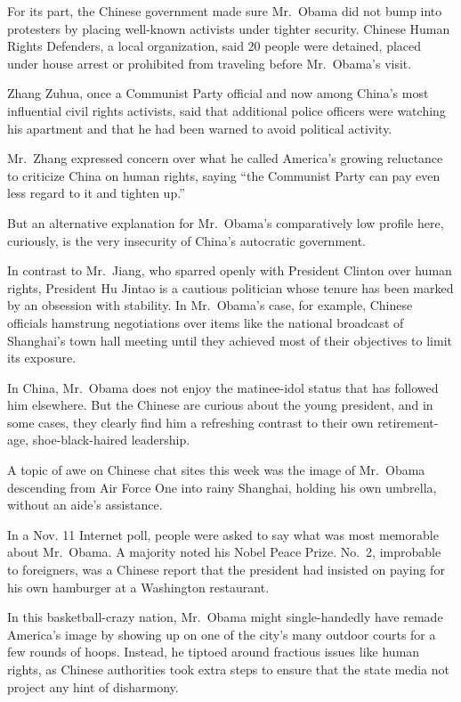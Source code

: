 ﻿\documentclass[12pt]{article}
\begin{document}
For its part, the Chinese government made sure Mr.~Obama did not bump into protesters by placing
well-known activists under tighter security. Chinese Human Rights Defenders, a local organization,
said 20 people were detained, placed under house arrest or prohibited from traveling before
Mr.~Obama's visit.

Zhang Zuhua, once a Communist Party official and now among China's most influential civil rights
activists, said that additional police officers were watching his apartment and that he had been
warned to avoid political activity.

Mr.~Zhang expressed concern over what he called America's growing reluctance to criticize China on
human rights, saying ``the Communist Party can pay even less regard to it and tighten up.''

But an alternative explanation for Mr.~Obama's comparatively low profile here, curiously, is the
very insecurity of China's autocratic government.

In contrast to Mr.~Jiang, who sparred openly with President Clinton over human rights, President Hu
Jintao is a cautious politician whose tenure has been marked by an obsession with stability. In
Mr.~Obama's case, for example, Chinese officials hamstrung negotiations over items like the national
broadcast of Shanghai's town hall meeting until they achieved most of their objectives to limit its
exposure.

In China, Mr.~Obama does not enjoy the matinee-idol status that has followed him elsewhere. But the
Chinese are curious about the young president, and in some cases, they clearly find him a refreshing
contrast to their own retirement-age, shoe-black-haired leadership.

A topic of awe on Chinese chat sites this week was the image of Mr.~Obama descending from Air Force
One into rainy Shanghai, holding his own umbrella, without an aide's assistance.

In a Nov. 11 Internet poll, people were asked to say what was most memorable about Mr.~Obama. A
majority noted his Nobel Peace Prize. No.~2, improbable to foreigners, was a Chinese report that the
president had insisted on paying for his own hamburger at a Washington restaurant.

In this basketball-crazy nation, Mr.~Obama might single-handedly have remade America's image by
showing up on one of the city's many outdoor courts for a few rounds of hoops. Instead, he tiptoed
around fractious issues like human rights, as Chinese authorities took extra steps to ensure that
the state media not project any hint of disharmony.
\end{document}
